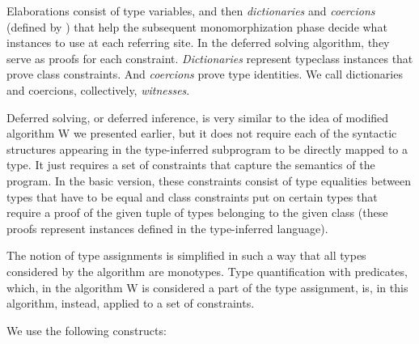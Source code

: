 Elaborations consist of type variables, and then \emph{dictionaries} and \emph{coercions} (defined by \citet{vytiniotis2011outsidein}) that help the subsequent monomorphization phase decide what instances to use at each referring site. In the deferred solving algorithm, they serve as proofs for each constraint. \emph{Dictionaries} represent typeclass instances that prove class constraints. And \emph{coercions} prove type identities. We call dictionaries and coercions, collectively, \emph{witnesses}.

Deferred solving, or deferred inference, is very similar to the idea of modified algorithm W we presented earlier, but it does not require each of the syntactic structures appearing in the type-inferred subprogram to be directly mapped to a type. It just requires a set of constraints that capture the semantics of the program. In the basic version, these constraints consist of type equalities between types that have to be equal and class constraints put on certain types that require a proof of the given tuple of types belonging to the given class (these proofs represent instances defined in the type-inferred language).

The notion of type assignments is simplified in such a way that all types considered by the algorithm are monotypes. Type quantification with predicates, which, in the algorithm W is considered a part of the type assignment, is, in this algorithm, instead, applied to a set of constraints.

We use the following constructs:



